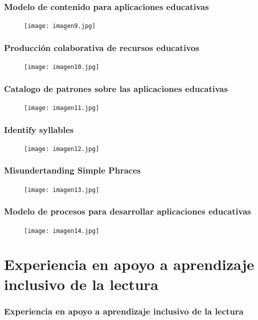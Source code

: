 \documentclass[11pt]{beamer}
\begin{document}
\begin{frame}
\frametitle{Modelo de contenido para aplicaciones educativas}
    \begin{figure}
    \centering
     \texttt{[image: imagen9.jpg]}
    \end{figure}
\end{frame}

\begin{frame}
\frametitle{Producción colaborativa de recursos educativos}
    \begin{figure}
    \centering
     \texttt{[image: imagen10.jpg]}
    \end{figure}
\end{frame}

\begin{frame}
\frametitle{Catalogo de patrones sobre las aplicaciones educativas}
    \begin{figure}
    \centering
     \texttt{[image: imagen11.jpg]}
    \end{figure}
\end{frame}

\begin{frame}
\frametitle{Identify syllables}
    \begin{figure}
    \centering
     \texttt{[image: imagen12.jpg]}
    \end{figure}
\end{frame}

\begin{frame}
\frametitle{Misundertanding Simple Phraces}
    \begin{figure}
    \centering
     \texttt{[image: imagen13.jpg]}
    \end{figure}
\end{frame}

\begin{frame}
\frametitle{Modelo de procesos para desarrollar aplicaciones educativas}
    \begin{figure}
    \centering
     \texttt{[image: imagen14.jpg]}
    \end{figure}
\end{frame}


\section{Experiencia en apoyo a aprendizaje inclusivo de la lectura}
\begin{frame}
\frametitle{Experiencia en apoyo a aprendizaje inclusivo de la lectura}
\end{frame}
\end{document}
